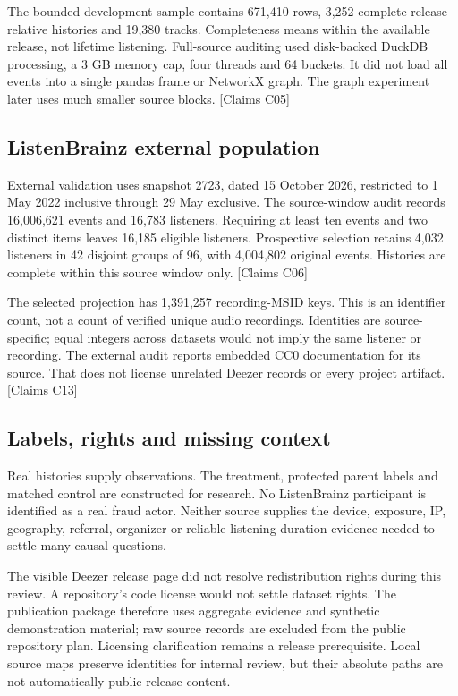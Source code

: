 \documentclass[11pt,letterpaper]{article}
\newcommand{\claims}[1]{{\small\textsf{[Claims #1]}}}
\begin{document}
The bounded development sample contains 671,410 rows, 3,252 complete release-relative histories and 19,380 tracks. Completeness means within the available release, not lifetime listening. Full-source auditing used disk-backed DuckDB processing, a 3 GB memory cap, four threads and 64 buckets. It did not load all events into a single pandas frame or NetworkX graph. The graph experiment later uses much smaller source blocks. \claims{C05}

\subsection{ListenBrainz external population}
External validation uses snapshot 2723, dated 15 October 2026, restricted to 1 May 2022 inclusive through 29 May exclusive. The source-window audit records 16,006,621 events and 16,783 listeners. Requiring at least ten events and two distinct items leaves 16,185 eligible listeners. Prospective selection retains 4,032 listeners in 42 disjoint groups of 96, with 4,004,802 original events. Histories are complete within this source window only. \claims{C06}

The selected projection has 1,391,257 recording-MSID keys. This is an identifier count, not a count of verified unique audio recordings. Identities are source-specific; equal integers across datasets would not imply the same listener or recording. The external audit reports embedded CC0 documentation for its source. That does not license unrelated Deezer records or every project artifact. \claims{C13}

\subsection{Labels, rights and missing context}
Real histories supply observations. The treatment, protected parent labels and matched control are constructed for research. No ListenBrainz participant is identified as a real fraud actor. Neither source supplies the device, exposure, IP, geography, referral, organizer or reliable listening-duration evidence needed to settle many causal questions.

The visible Deezer release page did not resolve redistribution rights during this review. A repository's code license would not settle dataset rights. The publication package therefore uses aggregate evidence and synthetic demonstration material; raw source records are excluded from the public repository plan. Licensing clarification remains a release prerequisite. Local source maps preserve identities for internal review, but their absolute paths are not automatically public-release content.
\end{document}
